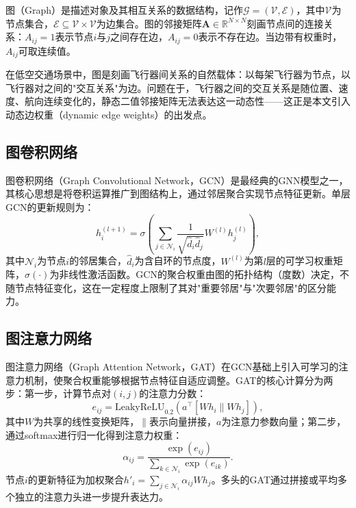 \documentclass[12pt,a4paper,UTF8]{ctexbook}
\begin{document}
图（Graph）是描述对象及其相互关系的数据结构，记作$\mathcal{G}=(\mathcal{V},\mathcal{E})$，其中$\mathcal{V}$为节点集合，$\mathcal{E}\subseteq\mathcal{V}\times\mathcal{V}$为边集合。图的邻接矩阵$\bm{A}\in\mathbb{R}^{N\times N}$刻画节点间的连接关系：$A_{ij}=1$表示节点$i$与$j$之间存在边，$A_{ij}=0$表示不存在边。当边带有权重时，$A_{ij}$可取连续值。

在低空交通场景中，图是刻画飞行器间关系的自然载体：以每架飞行器为节点，以飞行器对之间的"交互关系"为边。问题在于，飞行器之间的交互关系是随位置、速度、航向连续变化的，静态二值邻接矩阵无法表达这一动态性——这正是本文引入动态边权重（dynamic edge weights）的出发点。

\subsection{图卷积网络}

图卷积网络（Graph Convolutional Network，GCN）\cite{ref32}是最经典的GNN模型之一，其核心思想是将卷积运算推广到图结构上，通过邻居聚合实现节点特征更新。单层GCN的更新规则为：
\begin{equation}
    h_i^{(l+1)} = \sigma\!\left(\sum_{j\in\mathcal{N}_i}\frac{1}{\sqrt{\hat{d}_i\hat{d}_j}}W^{(l)}h_j^{(l)}\right),
    \label{eq:gcn}
\end{equation}
其中$\mathcal{N}_i$为节点$i$的邻居集合，$\hat{d}_i$为含自环的节点度，$W^{(l)}$为第$l$层的可学习权重矩阵，$\sigma(\cdot)$为非线性激活函数。GCN的聚合权重由图的拓扑结构（度数）决定，不随节点特征变化，这在一定程度上限制了其对"重要邻居"与"次要邻居"的区分能力。

\subsection{图注意力网络}

图注意力网络（Graph Attention Network，GAT）\cite{ref31}在GCN基础上引入可学习的注意力机制，使聚合权重能够根据节点特征自适应调整。GAT的核心计算分为两步：第一步，计算节点对$(i,j)$的注意力分数：
\begin{equation}
    e_{ij} = \text{LeakyReLU}_{0.2}\!\left(a^{\top}[W h_i \parallel W h_j]\right),
    \label{eq:gat_score}
\end{equation}
其中$W$为共享的线性变换矩阵，$\parallel$表示向量拼接，$a$为注意力参数向量；第二步，通过softmax进行归一化得到注意力权重：
\begin{equation}
    \alpha_{ij} = \frac{\exp(e_{ij})}{\sum_{k\in\mathcal{N}_i}\exp(e_{ik})}.
    \label{eq:gat_softmax}
\end{equation}
节点$i$的更新特征为加权聚合$h'_i=\sum_{j\in\mathcal{N}_i}\alpha_{ij}Wh_j$。多头的GAT通过拼接或平均多个独立的注意力头进一步提升表达力。
\end{document}
